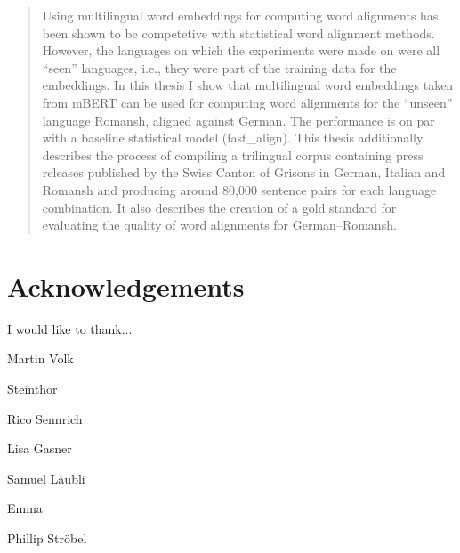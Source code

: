 \newpage
{} %
\begin{abstract}





Using multilingual word embeddings for computing word alignments has been shown to be competetive with statistical word alignment methods. 
However, the languages on which the experiments were made on were all \enquote{seen} languages, i.e., they were part of the training data for the embeddings. 
In this thesis I show that multilingual word embeddings taken from mBERT can be used for computing word alignments for the \enquote{unseen} language Romansh, aligned against German.
The performance is on par with a baseline statistical model (fast\_align). 
This thesis additionally describes the process of compiling a trilingual corpus containing press releases published by the Swiss Canton of Grisons in German, Italian and Romansh and producing around 80,000 sentence pairs for each language combination. 
It also describes the creation of a gold standard for evaluating the quality of word alignments for German--Romansh.

\end{abstract}


{}
\section*{Acknowledgements}
I would like to thank...

Martin Volk

Steinthor

Rico Sennrich

Lisa Gasner

Samuel Läubli

Emma 


Phillip Ströbel


